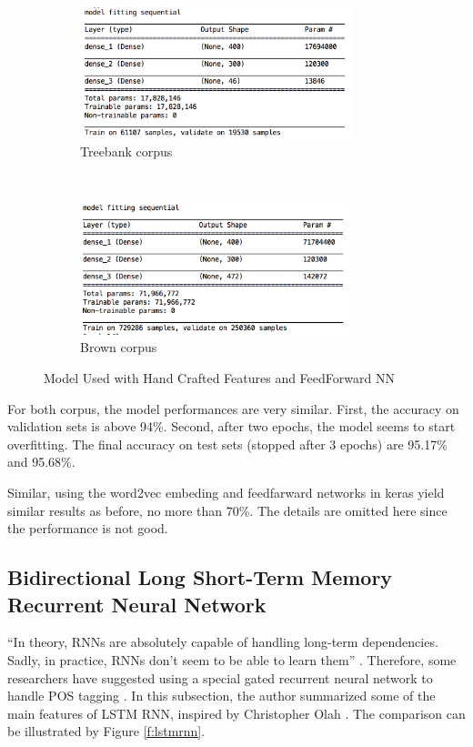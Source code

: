\documentclass[11pt]{article}
\theoremstyle{plain}
\begin{document}
\begin{figure}[!ht]
	\centering
	\begin{subfigure}[b]{\textwidth}
		\centering
		\includegraphics[height=1.5in]{images/model-tree.png}
		\caption{Treebank corpus}
	\end{subfigure}%
   \\
	\begin{subfigure}[b]{\textwidth}
			\centering
		\includegraphics[height=1.5in]{images/model-brown.png}
		\caption{Brown corpus}
	\end{subfigure}
	\caption{Model Used with Hand Crafted Features and FeedForward 
		NN}\label{f:mhc}
\end{figure}

For both corpus, the model performances are very similar. First, the 
accuracy on validation sets is above 94\%. Second, after two epochs, the 
model seems to start overfitting. The final accuracy on test sets (stopped 
after 3 epochs) are 95.17\% and 95.68\%. 

Similar, using the word2vec embeding and feedfarward networks in keras 
yield similar results as before, no more than 70\%. The details are omitted 
here since the performance is not good. 

\subsection{Bidirectional Long Short-Term Memory Recurrent Neural 
Network}
``In theory, RNNs are absolutely capable of handling  long-term 
dependencies. Sadly, in practice, RNNs don’t seem to be able to learn them'' 
\cite{olah-blog-lstm}. Therefore, some researchers have suggested using a 
special gated recurrent neural network to handle POS tagging 
\cite{Wang2015PartofSpeechTW}. In this subsection, the author summarized 
some of the main features of LSTM RNN, inspired by Christopher Olah 
\cite{olah-blog-lstm}. The comparison can be illustrated by Figure 
\ref{f:lstmrnn}.
\end{document}

